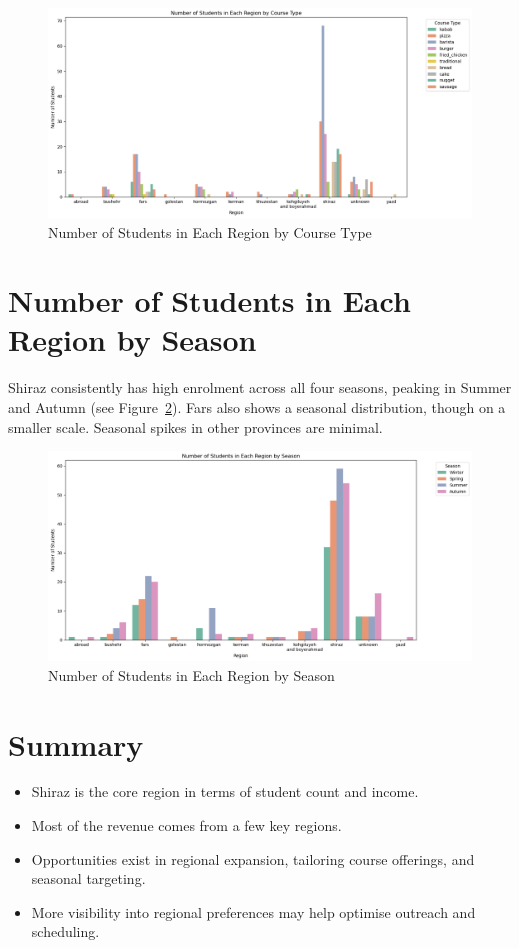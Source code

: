 \documentclass[12pt,a4paper]{article}
\begin{document}
\begin{figure}[h!]
    \centering
    \includegraphics[width=1\textwidth]{Number of Students in Each Region by Course Type.png}
    \caption{Number of Students in Each Region by Course Type}
    \label{fig:region-course}
\end{figure}

\section{Number of Students in Each Region by Season}
Shiraz consistently has high enrolment across all four seasons, peaking in Summer and Autumn (see Figure~\ref{fig:region-season}). Fars also shows a seasonal distribution, though on a smaller scale. Seasonal spikes in other provinces are minimal.

\begin{figure}[h!]
    \centering
    \includegraphics[width=1\textwidth]{Number of Students in Each Region by Season.png}
    \caption{Number of Students in Each Region by Season}
    \label{fig:region-season}
\end{figure}

\section*{Summary}
\begin{itemize}
    \item Shiraz is the core region in terms of student count and income.
    \item Most of the revenue comes from a few key regions.
    \item Opportunities exist in regional expansion, tailoring course offerings, and seasonal targeting.
    \item More visibility into regional preferences may help optimise outreach and scheduling.
\end{itemize}
\end{document}
